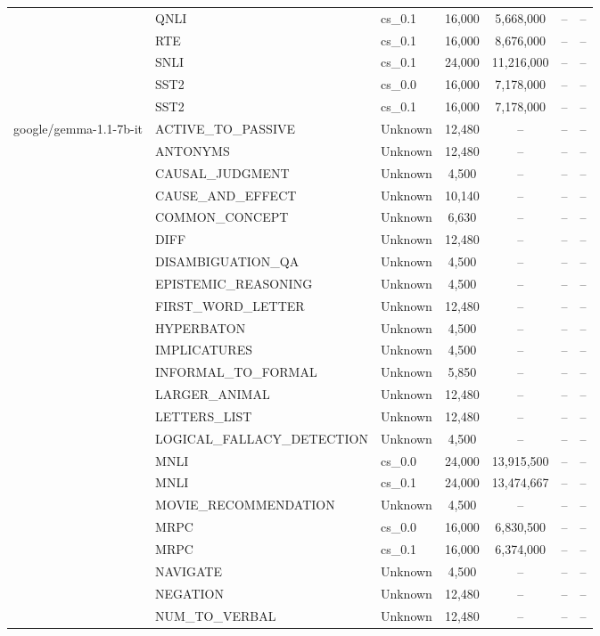 \begin{table}[ht]
{\begin{tabular}{@{}lllcccc@{}}
 & QNLI & cs\_0.1 & 16,000 & 5,668,000 & -- & -- \\
 & RTE & cs\_0.1 & 16,000 & 8,676,000 & -- & -- \\
 & SNLI & cs\_0.1 & 24,000 & 11,216,000 & -- & -- \\
 & SST2 & cs\_0.0 & 16,000 & 7,178,000 & -- & -- \\
 & SST2 & cs\_0.1 & 16,000 & 7,178,000 & -- & -- \\
\midrule
google/gemma-1.1-7b-it & ACTIVE\_TO\_PASSIVE & Unknown & 12,480 & -- & -- & -- \\
 & ANTONYMS & Unknown & 12,480 & -- & -- & -- \\
 & CAUSAL\_JUDGMENT & Unknown & 4,500 & -- & -- & -- \\
 & CAUSE\_AND\_EFFECT & Unknown & 10,140 & -- & -- & -- \\
 & COMMON\_CONCEPT & Unknown & 6,630 & -- & -- & -- \\
 & DIFF & Unknown & 12,480 & -- & -- & -- \\
 & DISAMBIGUATION\_QA & Unknown & 4,500 & -- & -- & -- \\
 & EPISTEMIC\_REASONING & Unknown & 4,500 & -- & -- & -- \\
 & FIRST\_WORD\_LETTER & Unknown & 12,480 & -- & -- & -- \\
 & HYPERBATON & Unknown & 4,500 & -- & -- & -- \\
 & IMPLICATURES & Unknown & 4,500 & -- & -- & -- \\
 & INFORMAL\_TO\_FORMAL & Unknown & 5,850 & -- & -- & -- \\
 & LARGER\_ANIMAL & Unknown & 12,480 & -- & -- & -- \\
 & LETTERS\_LIST & Unknown & 12,480 & -- & -- & -- \\
 & LOGICAL\_FALLACY\_DETECTION & Unknown & 4,500 & -- & -- & -- \\
 & MNLI & cs\_0.0 & 24,000 & 13,915,500 & -- & -- \\
 & MNLI & cs\_0.1 & 24,000 & 13,474,667 & -- & -- \\
 & MOVIE\_RECOMMENDATION & Unknown & 4,500 & -- & -- & -- \\
 & MRPC & cs\_0.0 & 16,000 & 6,830,500 & -- & -- \\
 & MRPC & cs\_0.1 & 16,000 & 6,374,000 & -- & -- \\
 & NAVIGATE & Unknown & 4,500 & -- & -- & -- \\
 & NEGATION & Unknown & 12,480 & -- & -- & -- \\
 & NUM\_TO\_VERBAL & Unknown & 12,480 & -- & -- & -- \\

\end{tabular}}
\end{table}
